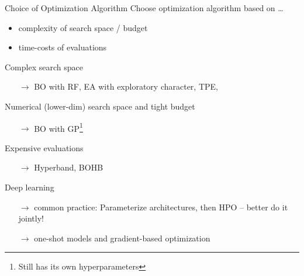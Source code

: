 \begin{frame}{Choice of Optimization Algorithm}
  Choose optimization algorithm based on \ldots
  \begin{itemize}
    \item complexity of search space / budget
    \item time-costs of evaluations
  \end{itemize}

  \vspace{0.5em}

  Complex search space
  \begin{itemize}
    \item[$\rightarrow$] BO with RF, EA with exploratory character, TPE, 
  \end{itemize}
  \pause
  Numerical (lower-dim) search space and tight budget
  \begin{itemize}
    \item[$\rightarrow$] BO with GP\footnote{Still has its own hyperparameters}
  \end{itemize}
  \pause
  Expensive evaluations
  \begin{itemize}
    \item[$\rightarrow$] Hyperband, BOHB
  \end{itemize}
  \pause
  Deep learning 
  \begin{itemize}
    \item[$\rightarrow$] common practice: Parameterize architectures, then HPO -- better do it jointly!
    \item[$\rightarrow$] one-shot models and gradient-based optimization
  \end{itemize}

\end{frame}



